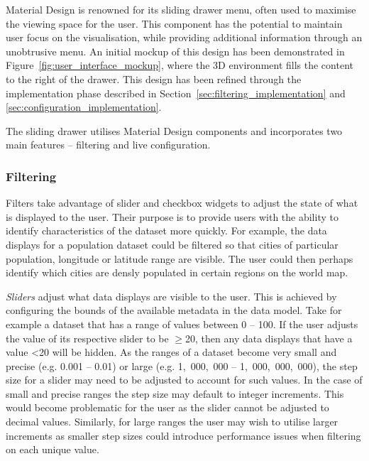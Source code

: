 {{		Material Design is renowned for its sliding drawer menu, often used to maximise the viewing space for the user. This component has the potential to maintain user focus on the visualisation, while providing additional information through an unobtrusive menu. An initial mockup of this design has been demonstrated in Figure~\ref{fig:user_interface_mockup}, where the 3D environment fills the content to the right of the drawer. This design has been refined through the implementation phase described in Section~\ref{sec:filtering_implementation} and \ref{sec:configuration_implementation}.

		

		The sliding drawer utilises Material Design components and incorporates two main features -- filtering and live configuration.

		\subsubsection{Filtering} {
		\label{sec:filtering}

			Filters take advantage of slider and checkbox widgets to adjust the state of what is displayed to the user. Their purpose is to provide users with the ability to identify characteristics of the dataset more quickly. For example, the data displays for a population dataset could be filtered so that cities of particular population, longitude or latitude range are visible. The user could then perhaps identify which cities are densly populated in certain regions on the world map. 

			\emph{Sliders} adjust what data displays are visible to the user. This is achieved by configuring the bounds of the available metadata in the data model. Take for example a dataset that has a range of values between 0 -- 100. If the user adjusts the value of its respective slider to be $\geqslant$20, then any data displays that have a value \textless20 will be hidden. As the ranges of a dataset become very small and precise (e.g. 0.001 -- 0.01) or large (e.g. 1,~000,~000 -- 1,~000,~000,~000), the step size for a slider may need to be adjusted to account for such values. In the case of small and precise ranges the step size may default to integer increments. This would become problematic for the user as the slider cannot be adjusted to decimal values. Similarly, for large ranges the user may wish to utilise larger increments as smaller step sizes could introduce performance issues when filtering on each unique value.
			
}}}
